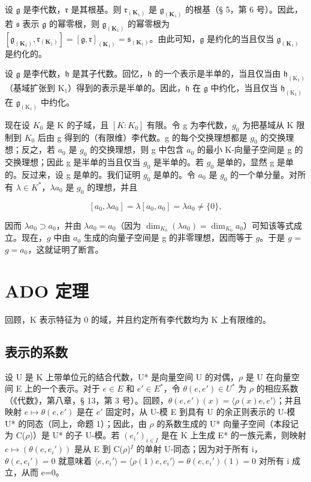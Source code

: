 设 \(\mathfrak{g}\) 是李代数，\(\mathfrak{r}\) 是其根基。则 \(\mathfrak{r}_{(\mathbf{K}_1)}\) 是 \(\mathfrak{g}_{(\mathbf{K}_1)}\) 的根基（§ 5，第 6 号）。因此，若 \(\mathfrak{s}\) 表示 \(\mathfrak{g}\) 的幂零根，则 \(\mathfrak{g}_{(\mathbf{K}_1)}\) 的幂零根为 \([\mathfrak{g}_{(\mathbf{K}_1)},\mathfrak{r}_{(\mathbf{K}_1)}] = [\mathfrak{g},\mathfrak{r}]_{(\mathbf{K}_1)} = \mathfrak{s}_{(\mathbf{K}_1)}\)。由此可知，\(\mathfrak{g}\) 是约化的当且仅当 \(\mathfrak{g}_{(\mathbf{K}_1)}\) 是约化的。

设 \(\mathfrak{g}\) 是李代数，\(\mathfrak{h}\) 是其子代数。回忆，\(\mathfrak{h}\) 的一个表示是半单的，当且仅当由 \(\mathfrak{h}_{(\mathrm{K}_1)}\)（基域扩张到 \(\mathrm{K}_1\)）得到的表示是半单的。因此，\(\mathfrak{h}\) 在 \(\mathfrak{g}\) 中约化，当且仅当 \(\mathfrak{h}_{(\mathrm{K}_1)}\) 在 \(\mathfrak{g}_{(\mathrm{K}_1)}\) 中约化。

现在设 \(K_{0}\) 是 K 的子域，且 \([K:K_{0}]\) 有限。令 g 为李代数，\(g_{0}\) 为把基域从 K 限制到 \(K_{0}\) 后由 g 得到的（有限维）李代数。g 的每个交换理想都是 \(g_{0}\) 的交换理想；反之，若 \(a_{0}\) 是 \(g_{0}\) 的交换理想，则 g 中包含 \(a_{0}\) 的最小 K-向量子空间是 g 的交换理想；因此 g 是半单的当且仅当 \(g_{0}\) 是半单的。若 \(g_{0}\) 是单的，显然 g 是单的。反过来，设 g 是单的。我们证明 \(g_{0}\) 是单的。令 \(a_{0}\) 是 \(g_{0}\) 的一个单分量。对所有 \(\lambda \in K^{*}\)，\(\lambda a_{0}\) 是 \(g_{0}\) 的理想，并且

\[
\left[ a _ {0}, \lambda a _ {0} \right] = \lambda \left[ a _ {0}, a _ {0} \right] = \lambda a _ {0} \neq \{0 \},
\]

因而 \(\lambda a_0 \supset a_0\)，并由 \(\lambda a_0 = a_0\)（因为 \(\dim_{K_0}(\lambda a_0) = \dim_{K_0}a_0\)）可知该等式成立。现在，\(g\) 中由 \(a_0\) 生成的向量子空间是 g 的非零理想，因而等于 \(g\)。于是 \(g\) = \(g = a_0\)，这就证明了断言。

\section{ADO 定理}

回顾，K 表示特征为 0 的域，并且约定所有李代数均为 K 上有限维的。

\subsection{表示的系数}

设 U 是 K 上带单位元的结合代数，U* 是向量空间 U 的对偶，\(\rho\) 是 U 在向量空间 E 上的一个表示。对于 \(e \in E\) 和 \(e' \in E^*\)，令 \(\theta(e, e') \in U^*\) 为 \(\rho\) 的相应系数（《代数》，第八章，§ 13，第 3 号）。回顾，\(\theta(e, e')(x) = \langle \rho(x)e, e' \rangle\)；并且映射 \(e \mapsto \theta(e, e')\) 是在 \(e'\) 固定时，从 U-模 E 到具有 U 的余正则表示的 U-模 U* 的同态（同上，命题 1）；因此，由 \(\rho\) 的系数生成的 U* 向量子空间（本段记为 C(\(\rho\))）是 U* 的子 U-模。若 \((e_i')_{i \in I}\) 是在 K 上生成 E* 的一族元素，则映射 \(e \mapsto (\theta(e, e_i'))\) 是从 E 到 C(\(\rho\))\(^{I}\) 的单射 U-同态；因为对于所有 i，\(\theta(e, e_i') = 0\) 就意味着 \(\langle e, e_i' \rangle = \langle \rho(1)e, e_i' \rangle = \theta(e, e_i')(1) = 0\) 对所有 i 成立，从而 e=0。

